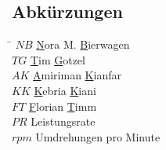 \subsection*{Abk\"urzungen}
\begin{tabbing}
\hspace*{2cm}\=\kill
$NB$ \> \underline{N}ora M. \underline{B}ierwagen \\[0.2ex]
$TG$ \> \underline{T}im \underline{G}otzel \\[0.2ex]
$AK$ \> \underline{A}miriman \underline{K}ianfar \\[0.2ex]
$KK$ \> \underline{K}ebria \underline{K}iani \\[0.2ex]
$FT$ \> \underline{F}lorian \underline{T}imm \\[0.2ex]
$PR$ \> Leistungsrate \\[0.2ex]
$rpm$ \> Umdrehungen pro Minute \\[0.2ex]
\end{tabbing}

